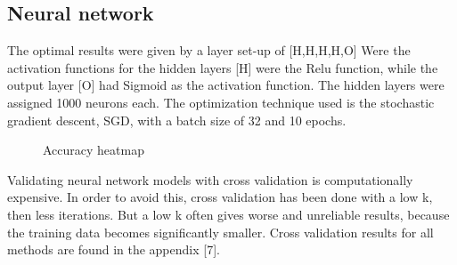 \subsection{Neural network}
The optimal results were given by a layer set-up of [H,H,H,H,O] Were the activation functions for the hidden layers [H] were the Relu function, while the output layer [O] had Sigmoid as the activation function. The hidden layers were assigned 1000 neurons each. The optimization technique used is the stochastic gradient descent, SGD, with a batch size of 32 and 10 epochs. 
\\
\par 
\begin{figure}[H]
  \centering
  \hfill
  \hfill
  \caption{Accuracy heatmap}
\end{figure}
Validating neural network models with cross validation is computationally expensive. In order to avoid this, cross validation has been done with a low k, then less iterations. But a low k often gives worse and unreliable results, because the training data becomes significantly smaller. Cross validation results for all methods are found in the appendix [7].
\newpage
